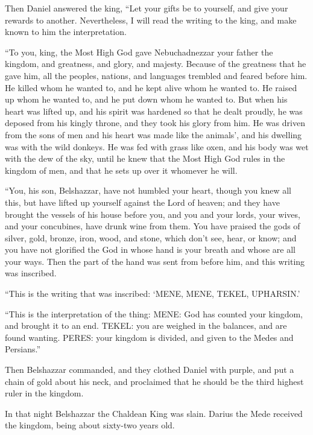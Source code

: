  Then Daniel answered the king, ``Let your gifts be to
yourself, and give your rewards to another. Nevertheless, I will read
the writing to the king, and make known to him the interpretation.

 ``To you, king, the Most High God gave Nebuchadnezzar your
father the kingdom, and greatness, and glory, and majesty. 
Because of the greatness that he gave him, all the peoples, nations, and
languages trembled and feared before him. He killed whom he wanted to,
and he kept alive whom he wanted to. He raised up whom he wanted to, and
he put down whom he wanted to.  But when his heart was
lifted up, and his spirit was hardened so that he dealt proudly, he was
deposed from his kingly throne, and they took his glory from him.
 He was driven from the sons of men and his heart was made
like the animals', and his dwelling was with the wild donkeys. He was
fed with grass like oxen, and his body was wet with the dew of the sky,
until he knew that the Most High God rules in the kingdom of men, and
that he sets up over it whomever he will.

 ``You, his son, Belshazzar, have not humbled your heart,
though you knew all this,  but have lifted up yourself
against the Lord of heaven; and they have brought the vessels of his
house before you, and you and your lords, your wives, and your
concubines, have drunk wine from them. You have praised the gods of
silver, gold, bronze, iron, wood, and stone, which don't see, hear, or
know; and you have not glorified the God in whose hand is your breath
and whose are all your ways.  Then the part of the hand was
sent from before him, and this writing was inscribed.

 ``This is the writing that was inscribed: `MENE, MENE,
TEKEL, UPHARSIN.'

 ``This is the interpretation of the thing: MENE: God has
counted your kingdom, and brought it to an end.  TEKEL: you
are weighed in the balances, and are found wanting.  PERES:
your kingdom is divided, and given to the Medes and Persians.''

 Then Belshazzar commanded, and they clothed Daniel with
purple, and put a chain of gold about his neck, and proclaimed that he
should be the third highest ruler in the kingdom.

 In that night Belshazzar the Chaldean King was slain.
 Darius the Mede received the kingdom, being about
sixty-two years old.

